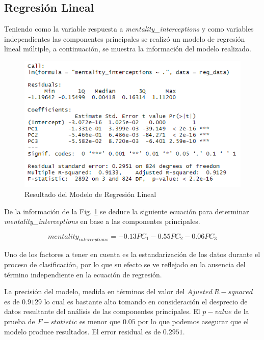 \documentclass[a4paper,10pt,twocolumn]{article}
\begin{document}
\subsection{Regresión Lineal}\label{sec:reg_li}

Teniendo como la variable respuesta a \textit{mentality\_interceptions} y como variables independientes las componentes principales se realizó un modelo de regresión lineal múltiple, a continuación, se muestra la información del modelo realizado.

\begin{figure}[htb]%
	\begin{center}
		\includegraphics[width=\linewidth]{reg_li}
	\end{center}
	\caption{Resultado del Modelo de Regresión Lineal \label{fig:reg_li}}%
\end{figure}

De la información de la Fig. \ref{fig:reg_li} se deduce la siguiente ecuación para determinar \textit{mentality\_interceptions} en base a las componentes principales.

$$ mentality_{interceptions} = -0.13 PC_1 - 0.55 PC_2 - 0.06 PC_3 $$

Uno de los factores a tener en cuenta es la estandarización de los datos durante el proceso de clasificación, por lo que su efecto se ve reflejado en la ausencia del término independiente en la ecuación de regresión.

La precisión del modelo, medida en términos del valor del $Ajusted\ R-squared$ es de $0.9129$ lo cual es bastante alto tomando en consideración el desprecio de datos resultante del análisis de las componentes principales. El $p-value$ de la prueba de $F-statistic$ es menor que $0.05$ por lo que podemos asegurar que el modelo produce resultados. El error residual es de $0.2951$.
\end{document}
